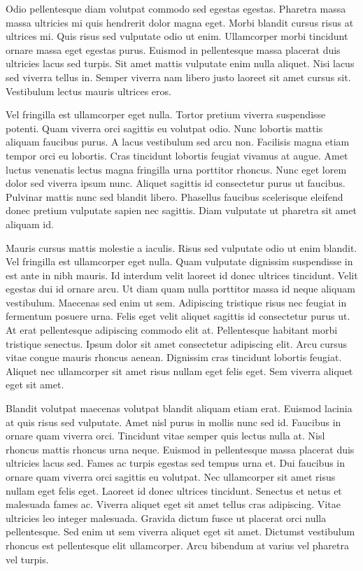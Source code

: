 \documentclass[11pt,a4paper]{article}
\begin{document}
Odio pellentesque diam volutpat commodo sed egestas egestas. Pharetra massa massa ultricies mi quis hendrerit dolor magna eget. Morbi blandit cursus risus at ultrices mi. Quis risus sed vulputate odio ut enim. Ullamcorper morbi tincidunt ornare massa eget egestas purus. Euismod in pellentesque massa placerat duis ultricies lacus sed turpis. Sit amet mattis vulputate enim nulla aliquet. Nisi lacus sed viverra tellus in. Semper viverra nam libero justo laoreet sit amet cursus sit. Vestibulum lectus mauris ultrices eros.

Vel fringilla est ullamcorper eget nulla. Tortor pretium viverra suspendisse potenti. Quam viverra orci sagittis eu volutpat odio. Nunc lobortis mattis aliquam faucibus purus. A lacus vestibulum sed arcu non. Facilisis magna etiam tempor orci eu lobortis. Cras tincidunt lobortis feugiat vivamus at augue. Amet luctus venenatis lectus magna fringilla urna porttitor rhoncus. Nunc eget lorem dolor sed viverra ipsum nunc. Aliquet sagittis id consectetur purus ut faucibus. Pulvinar mattis nunc sed blandit libero. Phasellus faucibus scelerisque eleifend donec pretium vulputate sapien nec sagittis. Diam vulputate ut pharetra sit amet aliquam id.

Mauris cursus mattis molestie a iaculis. Risus sed vulputate odio ut enim blandit. Vel fringilla est ullamcorper eget nulla. Quam vulputate dignissim suspendisse in est ante in nibh mauris. Id interdum velit laoreet id donec ultrices tincidunt. Velit egestas dui id ornare arcu. Ut diam quam nulla porttitor massa id neque aliquam vestibulum. Maecenas sed enim ut sem. Adipiscing tristique risus nec feugiat in fermentum posuere urna. Felis eget velit aliquet sagittis id consectetur purus ut. At erat pellentesque adipiscing commodo elit at. Pellentesque habitant morbi tristique senectus. Ipsum dolor sit amet consectetur adipiscing elit. Arcu cursus vitae congue mauris rhoncus aenean. Dignissim cras tincidunt lobortis feugiat. Aliquet nec ullamcorper sit amet risus nullam eget felis eget. Sem viverra aliquet eget sit amet.

Blandit volutpat maecenas volutpat blandit aliquam etiam erat. Euismod lacinia at quis risus sed vulputate. Amet nisl purus in mollis nunc sed id. Faucibus in ornare quam viverra orci. Tincidunt vitae semper quis lectus nulla at. Nisl rhoncus mattis rhoncus urna neque. Euismod in pellentesque massa placerat duis ultricies lacus sed. Fames ac turpis egestas sed tempus urna et. Dui faucibus in ornare quam viverra orci sagittis eu volutpat. Nec ullamcorper sit amet risus nullam eget felis eget. Laoreet id donec ultrices tincidunt. Senectus et netus et malesuada fames ac. Viverra aliquet eget sit amet tellus cras adipiscing. Vitae ultricies leo integer malesuada. Gravida dictum fusce ut placerat orci nulla pellentesque. Sed enim ut sem viverra aliquet eget sit amet. Dictumst vestibulum rhoncus est pellentesque elit ullamcorper. Arcu bibendum at varius vel pharetra vel turpis.
\end{document}

